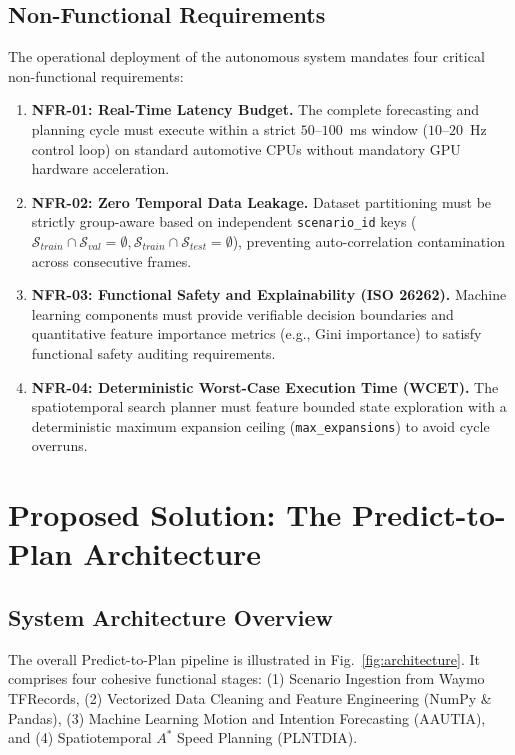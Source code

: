 \documentclass[runningheads]{llncs}
\begin{document}
\subsection{Non-Functional Requirements}
The operational deployment of the autonomous system mandates four critical non-functional requirements:
\begin{enumerate}
    \item \textbf{NFR-01: Real-Time Latency Budget.} The complete forecasting and planning cycle must execute within a strict $50$--$100$~ms window ($10$--$20$~Hz control loop) on standard automotive CPUs without mandatory GPU hardware acceleration.
    \item \textbf{NFR-02: Zero Temporal Data Leakage.} Dataset partitioning must be strictly group-aware based on independent \texttt{scenario\_id} keys ($\mathcal{S}_{train} \cap \mathcal{S}_{val} = \emptyset, \mathcal{S}_{train} \cap \mathcal{S}_{test} = \emptyset$), preventing auto-correlation contamination across consecutive frames.
    \item \textbf{NFR-03: Functional Safety and Explainability (ISO 26262).} Machine learning components must provide verifiable decision boundaries and quantitative feature importance metrics (e.g., Gini importance) to satisfy functional safety auditing requirements.
    \item \textbf{NFR-04: Deterministic Worst-Case Execution Time (WCET).} The spatiotemporal search planner must feature bounded state exploration with a deterministic maximum expansion ceiling (\texttt{max\_expansions}) to avoid cycle overruns.
\end{enumerate}

%
%
%
\section{Proposed Solution: The Predict-to-Plan Architecture}
\label{sec:solution}

\subsection{System Architecture Overview}
The overall Predict-to-Plan pipeline is illustrated in Fig.~\ref{fig:architecture}. It comprises four cohesive functional stages: (1) Scenario Ingestion from Waymo TFRecords, (2) Vectorized Data Cleaning and Feature Engineering (NumPy \& Pandas), (3) Machine Learning Motion and Intention Forecasting (AAUTIA), and (4) Spatiotemporal $A^*$ Speed Planning (PLNTDIA).
\end{document}
